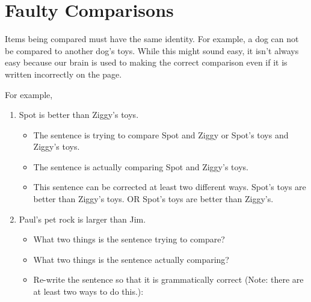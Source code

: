 \section{Faulty Comparisons}

Items being compared must have the same identity. For example, a dog can not be compared to
another dog's toys. While this might sound easy, it isn't always easy because our brain is used to
making the correct comparison even if it is written incorrectly on the page.


For example,

\begin{enumerate}
\item{Spot is better than Ziggy's toys.}

\begin{itemize}
\item{The sentence is trying to compare Spot and Ziggy or Spot's toys and Ziggy's toys.}
\item{The sentence is actually comparing Spot and Ziggy's toys.}
\item{This sentence can be corrected at least two different ways. Spot's toys are better
than Ziggy's toys. OR Spot's toys are better than Ziggy's.}
\end{itemize}

\item{Paul's pet rock is larger than Jim.}

\begin{itemize}
\item{What two things is the sentence trying to compare?} \hrulefill
\item{What two things is the sentence actually comparing?} \hrulefill
\item{Re-write the sentence so that it is grammatically correct (Note: there are at least two
ways to do this.):} \hrulefill
\end{itemize}

\end{enumerate}
